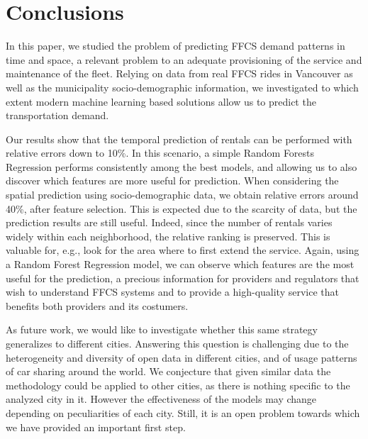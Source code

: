\section{Conclusions}
\label{sec:8_6_conclu}

In this paper, we studied the problem of predicting FFCS demand patterns in time and space, a relevant problem to an adequate provisioning of the service and maintenance of the fleet. 
Relying on data from real FFCS rides in Vancouver as well as the municipality socio-demographic information, we investigated to which extent modern machine learning based solutions allow us to predict the transportation demand.

Our results show that the temporal prediction of rentals can be performed with relative errors down to 10\%. In this scenario, a simple Random Forests Regression performs consistently among the best models, and allowing us to also discover which features are more useful for prediction. 
When considering the spatial prediction using socio-demographic data, we obtain relative errors around 40\%, after feature selection. This is expected due to the scarcity of data, but the prediction results are still useful. Indeed, since the number of rentals varies widely within each neighborhood, the relative ranking is preserved. This is valuable for, e.g., look for the area where to first extend the service. Again, using a Random Forest Regression model, we can observe which features are the most useful for the prediction, a precious information for providers and regulators that wish to understand FFCS systems and to provide a high-quality service that benefits both providers and its costumers. 


As future work, we would like to investigate whether this same strategy generalizes to different cities. Answering this question is challenging due to the heterogeneity and diversity of open data in different cities, and of usage patterns of car sharing around the world. We conjecture that given similar data the methodology could be applied to other cities, as there is nothing specific to the analyzed city in it. However the effectiveness of the models may change depending on peculiarities of each city. Still, it is an open problem towards which we have provided an important first step.



